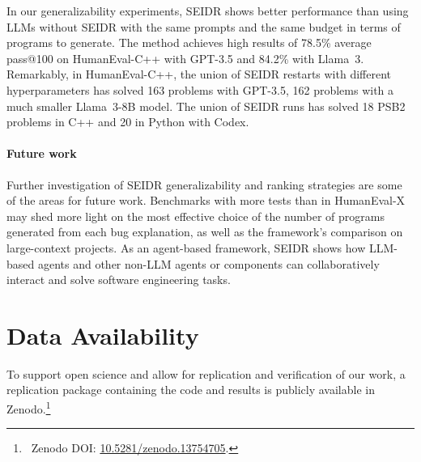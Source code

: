In our generalizability experiments, SEIDR shows better performance than using LLMs without SEIDR with the same prompts and the same budget in terms of programs to generate.
The method achieves high results of 78.5\% average pass@100 on HumanEval-C++ with GPT-3.5 and 84.2\% with Llama~3.
Remarkably, in HumanEval-C++, the union of SEIDR restarts with different hyperparameters has solved 163 problems with GPT-3.5, 162 problems with a much smaller Llama~3-8B model.
The union of SEIDR runs has solved 18 PSB2 problems in C++ and 20 in Python with Codex. 

\paragraph{Future work}
Further investigation of SEIDR generalizability and ranking strategies are some of the areas for future work. 
Benchmarks with more tests than in HumanEval-X may shed more light on the most effective choice of the number of programs generated from each bug explanation, as well as the framework's comparison on large-context projects. 
As an agent-based framework, SEIDR shows how LLM-based agents and other non-LLM agents or components can collaboratively interact and solve software engineering tasks.

\section{Data Availability}

To support open science and allow for replication and verification of our work, a replication package containing the code and results is publicly available in Zenodo.\footnote{~Zenodo DOI: \href{https://doi.org/10.5281/zenodo.13754705}{10.5281/zenodo.13754705}.
}

